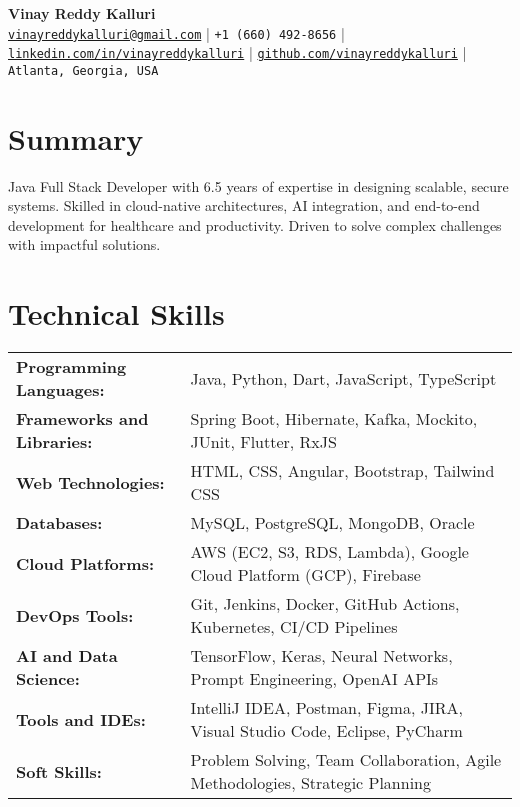 \documentclass[a4paper,10pt]{article}
\begin{document}
\begin{center}
    {\LARGE \textbf{Vinay Reddy Kalluri}} \\[0.2cm]
    \small
    \href{mailto:vinayreddykalluri@gmail.com}{\texttt{vinayreddykalluri@gmail.com}} \quad | \quad 
    \texttt{+1 (660) 492-8656} \quad | \quad 
    \href{https://www.linkedin.com/in/vinayreddykalluri/}{\texttt{linkedin.com/in/vinayreddykalluri}} \quad | \quad 
    \href{https://github.com/vinayreddykalluri}{\texttt{github.com/vinayreddykalluri}} \quad | \quad 
    \texttt{Atlanta, Georgia, USA} \\
\end{center}


\section*{Summary}
Java Full Stack Developer with 6.5 years of expertise in designing scalable, secure systems. Skilled in cloud-native architectures, AI integration, and end-to-end development for healthcare and productivity. Driven to solve complex challenges with impactful solutions.



\section*{Technical Skills}
\begin{tabular}{@{}p{5.5cm}p{12cm}@{}}
\textbf{Programming Languages:}  & Java, Python, Dart, JavaScript, TypeScript \\
\textbf{Frameworks and Libraries:} & Spring Boot, Hibernate, Kafka, Mockito, JUnit, Flutter, RxJS \\
\textbf{Web Technologies:}       & HTML, CSS, Angular, Bootstrap, Tailwind CSS \\
\textbf{Databases:}              & MySQL, PostgreSQL, MongoDB, Oracle \\
\textbf{Cloud Platforms:}        & AWS (EC2, S3, RDS, Lambda), Google Cloud Platform (GCP), Firebase \\
\textbf{DevOps Tools:}           & Git, Jenkins, Docker, GitHub Actions, Kubernetes, CI/CD Pipelines \\
\textbf{AI and Data Science:}    & TensorFlow, Keras, Neural Networks, Prompt Engineering, OpenAI APIs \\
\textbf{Tools and IDEs:}         & IntelliJ IDEA, Postman, Figma, JIRA, Visual Studio Code, Eclipse, PyCharm \\
\textbf{Soft Skills:}            & Problem Solving, Team Collaboration, Agile Methodologies, Strategic Planning \\
\end{tabular}
\end{document}
